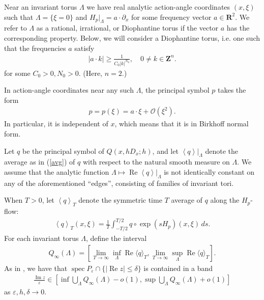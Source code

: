 \documentclass[12pt,lettersize]{article}
\DeclareMathOperator{\spec}{spec}
\DeclareMathOperator{\Real}{Re}
\DeclareMathOperator{\Imag}{Im}
\renewcommand{\epsilon}{\varepsilon}
\newcommand{\union}{\bigcup}
\theoremstyle{plain}%
\numberwithin{theorem}{section}
\numberwithin{equation}{section}
\theoremstyle{definition}
\theoremstyle{remark}
\begin{document}
{Near an invariant torus $\Lambda$ we have real analytic action-angle coordinates $(x,\xi)$ such that $\Lambda = \{\xi = 0\}$ and $H_p|_\Lambda = a\cdot \partial_x$ for some frequency vector $a\in \mathbf{R}^2$. We refer to $\Lambda$ as a rational, irrational, or Diophantine torus if the vector $a$ has the corresponding property. Below, we will consider a Diophantine torus, i.e. one such that the frequencies $a$ satisfy
%
\begin{align}\label{diof}
|a\cdot k| \geq \frac{1}{C_0|k|^{N_0}}, \quad 0 \neq k \in \mathbf{Z}^n. 
\end{align}
%
for some $C_0>0,N_0>0$. (Here, $n = 2$.)


In action-angle coordinates near any such $\Lambda$, the principal symbol $p$ takes the form
%
\begin{align}\label{expansion}
p = p(\xi) = a\cdot \xi + \mathcal{O}(\xi^2).
\end{align}
%
In particular, it is independent of $x$, which means that it is in Birkhoff normal form. 

Let $q$ be the principal symbol of $Q(x,hD_x;h)$, and let $\left\langle q \right\rangle|_{\Lambda}$ denote the average as in (\ref{avg}) of $q$ with respect to the natural smooth measure on $\Lambda$. We assume that the analytic function $\Lambda\mapsto \Real \left\langle q \right\rangle|_\Lambda$ is not identically constant on any of the aforementioned ``edges'', consisting of families of invariant tori. 




When $T > 0$, let $\left\langle q \right\rangle_T$ denote the symmetric time $T$ average of $q$ along the $H_p$-flow:
%
\begin{align*}{}
\left\langle q \right\rangle_T(x,\xi) = \frac{1}{T} \int_{-T/2}^{T/2} q\circ \exp(sH_p)(x,\xi)\, ds. 
\end{align*}
%
%
%
For each invariant torus $\Lambda$, define the interval
%
\begin{align}\label{Qinf}
Q_\infty(\Lambda) = \left[\lim_{T\to \infty} \inf_{\Lambda} \Real \langle q \rangle_T, \lim_{T\to \infty} \sup_{\Lambda}\Real \langle q \rangle_T \right].
\end{align}
%
As in \cite{SjDWE}, we have that $\spec P_\epsilon \cap \{|\Real z| \leq \delta\}$ is contained in a band 
%
\begin{align*}{}
\frac{\Imag z}{\epsilon} \in \left[ \inf \union_\Lambda Q_\infty(\Lambda) - o(1), \sup \union_\Lambda Q_\infty(\Lambda) + o(1)\right]
\end{align*}
%
as $\epsilon,h,\delta \to 0$. 

}
\end{document}
